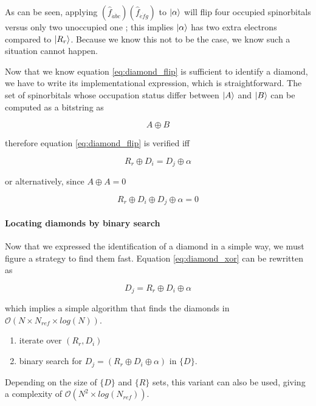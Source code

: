 \documentclass[./thesis.tex]{subfiles}
\begin{document}
As can be seen, applying $(\hat f_{\dot a \dot bc})(\hat f_{\dot e \dot fg})$ to ${\ket{\alpha}}$ will flip four occupied spinorbitals versus only two unoccupied one ; this implies ${\ket{\alpha}}$ has two extra electrons compared to $\ket {R_r}$. Because we know this not to be the case, we know such a situation cannot happen.

Now that we know equation \ref{eq:diamond_flip} is sufficient to identify a diamond, we have to write its implementational expression, which is straightforward. The set of spinorbitals whose occupation status differ between $\ket A$ and $\ket B$ can be computed as a bitstring as

\begin{equation}
A \oplus B
\end{equation}

therefore equation \ref{eq:diamond_flip} is verified iff

\begin{equation}
R_r \oplus D_i = D_j \oplus \alpha
\end{equation}

or alternatively, since $A \oplus A = 0$

\begin{equation}
R_r \oplus D_i \oplus D_j \oplus \alpha = 0
\label{eq:diamond_xor}
\end{equation}

\paragraph{Locating diamonds by binary search}
Now that we expressed the identification of a diamond in a simple way, we must figure a strategy to find them fast. Equation \ref{eq:diamond_xor} can be rewritten as

\begin{equation}
D_j = R_r \oplus D_i \oplus \alpha
\end{equation}

which implies a simple algorithm that finds the diamonds in $\mathcal{O}(N \times N_{ref} \times log(N))$.
\begin{enumerate}
\item
iterate over $(R_r, D_i)$
\item
binary search for $D_j = (R_r \oplus D_i \oplus \alpha)$ in $\{D\}$. 
\end{enumerate}

Depending on the size of $\{D\}$ and $\{R\}$ sets, this variant can also be used, giving a complexity of $\mathcal{O}(N^2 \times log(N_{ref}))$.
\end{document}
